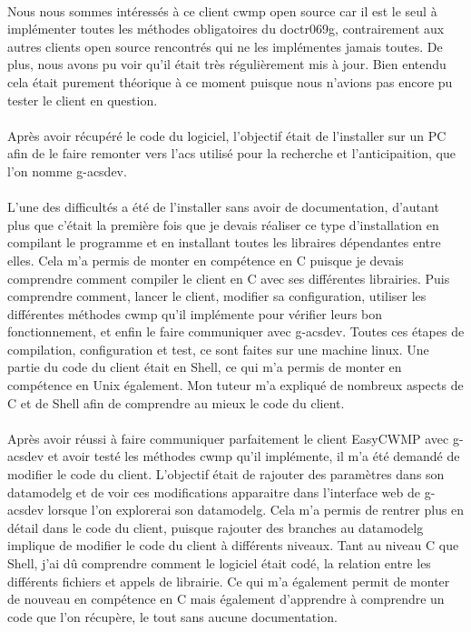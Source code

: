 \documentclass[12pt,a4paper]{report}
\begin{document}
\paragraph*{}Nous nous sommes intéressés à ce client \gls{cwmp} open source car il est le seul à implémenter toutes les méthodes obligatoires du \gls{doctr069g}, contrairement aux autres clients open source rencontrés qui ne les implémentes jamais toutes. De plus, nous avons pu voir qu’il était très régulièrement mis à jour. Bien entendu cela était purement théorique à ce moment puisque nous n'avions pas encore pu tester le client en question.
\paragraph*{}Après avoir récupéré le code du logiciel, l’objectif était de l’installer sur un PC afin de le faire remonter vers l'\gls{acs} utilisé pour la recherche et l'anticipaition, que l'on nomme g-acsdev. 
\paragraph*{}L’une des difficultés a été de l’installer sans avoir de documentation, d’autant plus que c’était la première fois que je devais réaliser ce type d’installation en compilant le programme et en installant toutes les libraires dépendantes entre elles. Cela m’a permis de monter en compétence en C puisque je devais comprendre comment compiler le client en C avec ses différentes librairies. Puis comprendre comment, lancer le client, modifier sa configuration, utiliser les différentes méthodes \gls{cwmp} qu’il implémente pour vérifier leurs bon fonctionnement, et enfin le faire communiquer avec g-acsdev. Toutes ces étapes de compilation, configuration et test, ce sont faites sur une machine linux. Une partie du code du client était en Shell, ce qui m’a permis de monter en compétence en Unix également. Mon tuteur m’a expliqué de nombreux aspects de C et de Shell afin de comprendre au mieux le code du client.
\paragraph*{}Après avoir réussi à faire communiquer parfaitement le client EasyCWMP avec g-acsdev et avoir testé les méthodes \gls{cwmp} qu’il implémente, il m’a été demandé de modifier le code du client. L’objectif était de rajouter des paramètres dans son \gls{datamodelg} et de voir ces modifications apparaitre dans l’interface web de g-acsdev lorsque l'on explorerai son \gls{datamodelg}. Cela m’a permis de rentrer plus en détail dans le code du client, puisque rajouter des branches au \gls{datamodelg} implique de modifier le code du client à différents niveaux. Tant au niveau C que Shell, j’ai dû comprendre comment le logiciel était codé, la relation entre les différents fichiers et appels de librairie. Ce qui m’a également permit de monter de nouveau en compétence en C mais également d’apprendre à comprendre un code que l’on récupère, le tout sans aucune documentation.
\end{document}
